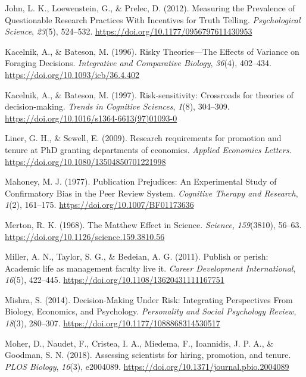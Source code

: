 \documentclass[
  british,
  a4paper,
  ,man,floatsintext]{apa6}
\newlength{\cslhangindent}
\newenvironment{CSLReferences}[2] %
 {\begin{list}{}{%
  \setlength{\itemindent}{0pt}
  \setlength{\leftmargin}{0pt}
  \setlength{\parsep}{0pt}
  \ifodd #1
   \setlength{\leftmargin}{\cslhangindent}
   \setlength{\itemindent}{-1\cslhangindent}
  \fi
  \setlength{\itemsep}{#2\baselineskip}}}
 {\end{list}}
\begin{document}
\begin{CSLReferences}{1}{0}
John, L. K., Loewenstein, G., \& Prelec, D. (2012). Measuring the {Prevalence} of {Questionable Research Practices With Incentives} for {Truth Telling}. \emph{Psychological Science}, \emph{23}(5), 524--532. \url{https://doi.org/10.1177/0956797611430953}

Kacelnik, A., \& Bateson, M. (1996). Risky {Theories}---{The Effects} of {Variance} on {Foraging Decisions}. \emph{Integrative and Comparative Biology}, \emph{36}(4), 402--434. \url{https://doi.org/10.1093/icb/36.4.402}

Kacelnik, A., \& Bateson, M. (1997). Risk-sensitivity: Crossroads for theories of decision-making. \emph{Trends in Cognitive Sciences}, \emph{1}(8), 304--309. \url{https://doi.org/10.1016/s1364-6613(97)01093-0}

Liner, G. H., \& Sewell, E. (2009). Research requirements for promotion and tenure at {PhD} granting departments of economics. \emph{Applied Economics Letters}. \url{https://doi.org/10.1080/13504850701221998}

Mahoney, M. J. (1977). Publication {Prejudices}: {An Experimental Study} of {Confirmatory Bias} in the {Peer Review System}. \emph{Cognitive Therapy and Research}, \emph{1}(2), 161--175. \url{https://doi.org/10.1007/BF01173636}

Merton, R. K. (1968). The {Matthew Effect} in {Science}. \emph{Science}, \emph{159}(3810), 56--63. \url{https://doi.org/10.1126/science.159.3810.56}

Miller, A. N., Taylor, S. G., \& Bedeian, A. G. (2011). Publish or perish: Academic life as management faculty live it. \emph{Career Development International}, \emph{16}(5), 422--445. \url{https://doi.org/10.1108/13620431111167751}

Mishra, S. (2014). Decision-{Making Under Risk}: {Integrating Perspectives From Biology}, {Economics}, and {Psychology}. \emph{Personality and Social Psychology Review}, \emph{18}(3), 280--307. \url{https://doi.org/10.1177/1088868314530517}

Moher, D., Naudet, F., Cristea, I. A., Miedema, F., Ioannidis, J. P. A., \& Goodman, S. N. (2018). Assessing scientists for hiring, promotion, and tenure. \emph{PLOS Biology}, \emph{16}(3), e2004089. \url{https://doi.org/10.1371/journal.pbio.2004089}


\end{CSLReferences}
\end{document}

